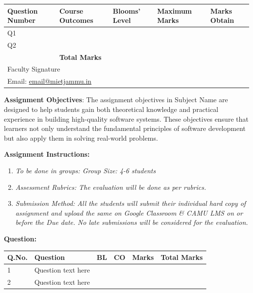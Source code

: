 \documentclass[12pt,a4paper]{article}
\begin{document}
\vspace{0.3cm}

\begin{table}[H]
\centering
\begin{tabular}{|p{2.2cm}|p{2.5cm}|p{2.8cm}|p{2.5cm}|p{2cm}|}
\hline
\textbf{Question Number} & \textbf{Course Outcomes} & \textbf{Blooms' Level} & \textbf{Maximum Marks} & \textbf{Marks Obtain} \\
\hline
Q1 &  &  &  & \\
\hline
Q2 &  &  &  & \\
\hline
 & \textbf{Total Marks} & &  & \\
\hline
\multicolumn{5}{|l|}{Faculty Signature} \\
\multicolumn{5}{|l|}{Email: \href{mailto:email@mietjammu.in}{email@mietjammu.in}} \\
\hline
\end{tabular}
\end{table}

\vspace{0.3cm}

\textbf{Assignment Objectives}: The assignment objectives in Subject Name are designed to help students gain both theoretical knowledge and practical experience in building high-quality software systems. These objectives ensure that learners not only understand the fundamental principles of software development but also apply them in solving real-world problems.

\textbf{Assignment Instructions:}

\begin{enumerate}[leftmargin=1.5cm]
\item \textit{To be done in groups: Group Size: 4-6 students}
\item \textit{Assessment Rubrics: The evaluation will be done as per rubrics.}
\item \textit{Submission Method: All the students will submit their individual hard copy of assignment and upload the same on Google Classroom \& CAMU LMS on or before the Due date. No late submissions will be considered for the evaluation.}
\end{enumerate}

\textbf{Question:}

\begin{table}[H]
\centering
\small
\begin{tabular}{|p{1cm}|p{7.8cm}|p{0.8cm}|p{0.8cm}|p{1.1cm}|p{1cm}|}
\hline
\textbf{Q.No.} & \textbf{Question} & \textbf{BL} & \textbf{CO} & \textbf{Marks} & \textbf{Total Marks} \\
\hline
1 & Question text here &  &  &  &  \\
\hline
2 & Question text here &  &  &  &  \\
\hline
\end{tabular}
\end{table}

\newpage


\end{document}
